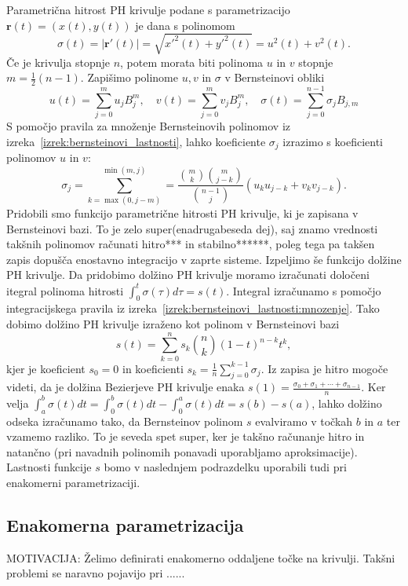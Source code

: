 \documentclass[isrm2, tisk]{fmfdelo}
\begin{document}
    Parametrična hitrost PH krivulje podane s parametrizacijo $\mathbf{r}(t)=(x(t),y(t))$ je dana s polinomom
    \[\sigma(t) = |\mathbf{r}'(t)| = \sqrt{x'^2(t)+y'^2(t)} = u^2(t)+v^2(t).\]
    Če je krivulja stopnje $n$, potem morata biti polinoma $u$ in $v$ stopnje $m=\frac{1}{2}(n-1)$.
    Zapišimo polinome $u,v$ in $\sigma$ v Bernsteinovi obliki \[u(t)=\sum_{j=0}^{m}u_j B_{j}^{m}, \quad v(t)=\sum_{j=0}^{m}v_j B_{j}^{m}, \quad \sigma(t)=\sum_{j=0}^{n-1}\sigma_j B_{j,m}\]
    S pomočjo pravila za množenje Bernsteinovih polinomov iz izreka~\ref{izrek:bernsteinovi_lastnosti}, lahko koeficiente $\sigma_j$ izrazimo s koeficienti polinomov $u$ in $v$:
    \[\sigma_j = \sum_{k=\max(0,j-m)}^{\min(m,j)} = \frac{\binom{m}{k}\binom{m}{j-k}}{\binom{n-1}{j}}(u_k u_{j-k}+v_k v_{j-k}).\]
    Pridobili smo funkcijo parametrične hitrosti PH krivulje, ki je zapisana v Bernsteinovi bazi.
    To je zelo super(enadrugabeseda dej), saj znamo vrednosti takšnih polinomov računati hitro*** in stabilno******, poleg tega pa takšen zapis dopušča enostavno integracijo v zaprte sisteme.
    Izpeljimo še funkcijo dolžine PH krivulje.
    Da pridobimo dolžino PH krivulje moramo izračunati določeni itegral polinoma hitrosti $\int_0^t\sigma(\tau)d\tau=s(t)$.
    Integral izračunamo s pomočjo integracijskega pravila iz izreka~\ref{izrek:bernsteinovi_lastnosti:mnozenje}.
    Tako dobimo dolžino PH krivulje izraženo kot polinom v Bernsteinovi bazi
    \[s(t)=\sum_{k=0}^n s_k \binom{n}{k}(1-t)^{n-k}t^k,\]
    kjer je koeficient $s_0=0$ in koeficienti $s_k = \frac{1}{n}\sum^{k-1}_{j=0}\sigma_j$.
    Iz zapisa je hitro mogoče videti, da je dolžina Bezierjeve PH krivulje enaka $s(1)=\frac{\sigma_0+\sigma_1+\cdots+\sigma_{n-1}}{n}$.
    Ker velja $\int_a^b \sigma(t)dt = \int_0^b\sigma(t)dt - \int_0^a\sigma(t)dt = s(b)-s(a)$, lahko dolžino odseka izračunamo tako, da Bernsteinov polinom $s$ evalviramo v točkah $b$ in $a$ ter vzamemo razliko.
    To je seveda spet super, ker je takšno računanje hitro in natančno (pri navadnih polinomih ponavadi uporabljamo aproksimacije).
    Lastnosti funkcije $s$ bomo v naslednjem podrazdelku uporabili tudi pri enakomerni parametrizaciji.

    \subsection{Enakomerna parametrizacija}
    MOTIVACIJA: Želimo definirati enakomerno oddaljene točke na krivulji. Takšni problemi se naravno pojavijo pri ...... \newline
\end{document}
